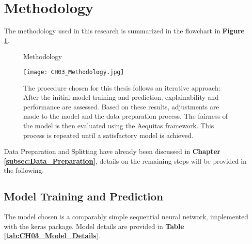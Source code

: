 \section{Methodology}\label{sec:Methodology}

The methodology used in this research is summarized in the flowchart in \textbf{Figure \ref{fig:CH03_Methodology}}. 

\begin{figure}[h]
    \centering
    \caption{Methodology}
    \texttt{[image: CH03\_Methodology.jpg]}
    \caption*{The procedure chosen for this thesis follows an iterative approach: After the initial model training and prediction, explainability and performance are assessed. Based on these results, adjustments are made to the model and the data preparation process. The fairness of the model is then evaluated using the Aequitas framework. This process is repeated until a satisfactory model is achieved.}
    \label{fig:CH03_Methodology}
\end{figure}

Data Preparation and Splitting have already been discussed in \textbf{Chapter \ref{subsec:Data_Preparation}}, details on the remaining steps will be provided in the following.

\subsection{Model Training and Prediction}\label{subsec:Model_Training_and_Prediction}

The model chosen is a comparably simple sequential neural network, implemented with the keras package. Model details are provided in \textbf{Table \ref{tab:CH03_Model_Details}}.

